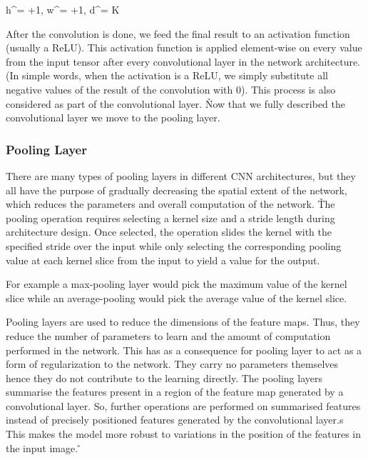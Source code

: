 \bse
h^\prime =  +1, \qquad w^\prime =  +1, \qquad d^\prime = K
\ese

After the convolution is done, we feed the final result to an activation function (usually a ReLU). This activation
function is applied element-wise on every value from the input tensor after every convolutional layer in the network
architecture. (In simple words, when the activation is a ReLU, we simply substitute all negative values of the result
of the convolution with 0). This process is also considered as part of the convolutional layer. \v

Now that we fully described the convolutional layer we move to the pooling layer.

\subsubsection*{Pooling Layer}

There are many types of pooling layers in different CNN architectures, but they all have the purpose of gradually
decreasing the spatial extent of the network, which reduces the parameters and overall computation of the network. \v

The pooling operation requires selecting a kernel size and a stride length during architecture design. Once selected,
the operation slides the kernel with the specified stride over the input while only selecting the corresponding
pooling value at each kernel slice from the input to yield a value for the output.

\be
For example a max-pooling layer would pick the maximum value of the kernel slice while an average-pooling would pick
the average value of the kernel slice.

\ee

Pooling layers are used to reduce the dimensions of the feature maps. Thus, they reduce the number of parameters to
learn and the amount of computation performed in the network. This has as a consequence for pooling layer to act as a
form of regularization to the network. They carry no parameters themselves hence they do not contribute to the
learning directly. The pooling layers summarise the features present in a region of the feature map generated by a
convolutional layer. So, further operations are performed on summarised features instead of precisely positioned
features generated by the convolutional layer.s This makes the model more robust to variations in the position of the
features in the input image. \v

